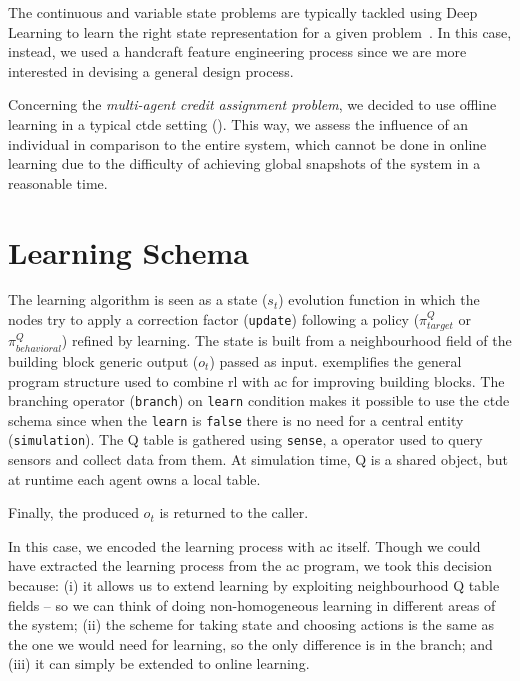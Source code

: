 

The continuous and variable state problems are typically tackled using Deep Learning to learn the right state representation for a given problem~\cite{DBLP:journals/corr/abs-1806-08894}. %
%
In this case, instead, we used a handcraft feature engineering process since we are more interested in devising a general design process.

Concerning the \emph{multi-agent credit assignment problem}, we decided to use offline learning 
in a typical \ac{ctde} setting ().
%
This way, we assess the influence of an individual in comparison to the entire system, which cannot be done in online learning due to the difficulty of achieving global snapshots of the system in a reasonable time.


\section{Learning Schema} 

The learning algorithm is seen as a state ($s_t$) evolution function in which the nodes try to apply a correction factor (\lstinline|update|) following a policy ($\pi^Q_{target}$ or $\pi^Q_{behavioral}$) refined by learning.
%
The state is built from a neighbourhood field of the building block generic output ($o_t$) passed as input.
%
 exemplifies the general program structure used to combine \ac{rl} with \ac{ac} for improving building blocks.
%
The branching operator (\lstinline|branch|) on \lstinline|learn| condition makes it possible to use the \ac{ctde} schema since when the \lstinline|learn| is \lstinline|false| there is no need for a central entity (\lstinline|simulation|).
%
The Q table is gathered using \lstinline|sense|, a \scafi{} operator used to query sensors and collect data from them. 
%
At simulation time, Q is a shared object, but at runtime each agent owns a local table.
%

%
Finally, the produced $o_{t}$ is returned to the caller.

In this case, we encoded the learning process with \ac{ac} itself. 
%
Though we could have extracted the learning process from the \ac{ac} program, %
 we took this decision because: 
  (i) it allows us to extend learning by exploiting neighbourhood Q table fields -- so we can think of doing non-homogeneous learning in different areas of the system;
  (ii) the scheme for taking state and choosing actions is the same as the one we would need for learning, so the only difference is in the branch; and
  (iii) it can simply be extended to online learning.
%

